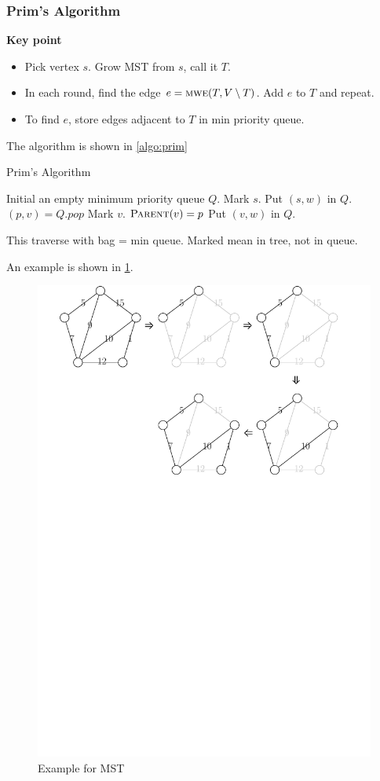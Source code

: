\subsubsection{Prim's Algorithm}
\vspace{0.1in}\noindent\textbf{Key point}
\begin{itemize}
    \item Pick vertex $s$. Grow MST from $s$, call it $T$.
    \item In each round, find the edge
        $e = \textsc{mwe} (T, V \setminus T)$.
        Add $e$ to $T$ and repeat.
    \item To find $e$, store edges adjacent to $T$
        in min priority queue.
\end{itemize}
The algorithm is shown in \cref{algo:prim}
\begin{algorithm}[H]
    \caption{Prim's Algorithm}\label{algo:prim}
    \begin{algorithmic}[1]
            \State Initial an empty minimum priority queue $Q$.
            \State Mark $s$.
                \State Put $(s,w)$ in $Q$.
            \EndFor
                \State $(p,v) = Q.pop$
                    \State Mark $v$.
                    \State $\textsc{Parent} (v) = p$
                        \State Put $(v,w)$ in $Q$.
                    \EndFor
                \EndIf
            \EndWhile
        \EndProcedure
    \end{algorithmic}
\end{algorithm}

\observation
This traverse with bag = min queue. Marked mean in tree, not in queue.

An example is shown in \cref{fig:prim}.
\begin{figure}[ht!]
    \caption{Example for MST}\label{fig:prim}
    \centering
    \includegraphics[width=.6\linewidth]{fig/PrimExample}
\end{figure}

